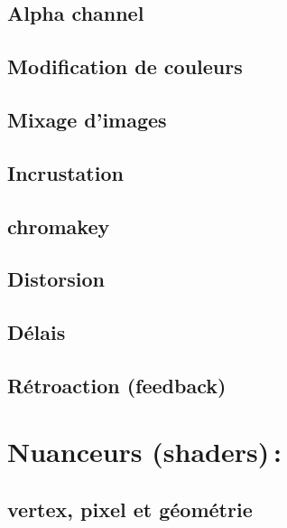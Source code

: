 \documentclass[
]{book}
\begin{document}
\hypertarget{alpha-channel-1}{%
\subsection{Alpha channel}\label{alpha-channel-1}}

\hypertarget{modification-de-couleurs}{%
\subsection{Modification de couleurs}\label{modification-de-couleurs}}

\hypertarget{mixage-dimages}{%
\subsection{Mixage d'images}\label{mixage-dimages}}

\hypertarget{incrustation}{%
\subsection{Incrustation}\label{incrustation}}

\hypertarget{chromakey}{%
\subsection{chromakey}\label{chromakey}}

\hypertarget{distorsion}{%
\subsection{Distorsion}\label{distorsion}}

\hypertarget{duxe9lais}{%
\subsection{Délais}\label{duxe9lais}}

\hypertarget{ruxe9troaction-feedback}{%
\subsection{Rétroaction (feedback)}\label{ruxe9troaction-feedback}}

\hypertarget{nuanceurs-shaders}{%
\section{Nuanceurs (shaders)\,:}\label{nuanceurs-shaders}}

\hypertarget{vertex-pixel-et-guxe9omuxe9trie}{%
\subsection{vertex, pixel et géométrie}\label{vertex-pixel-et-guxe9omuxe9trie}}
\end{document}
